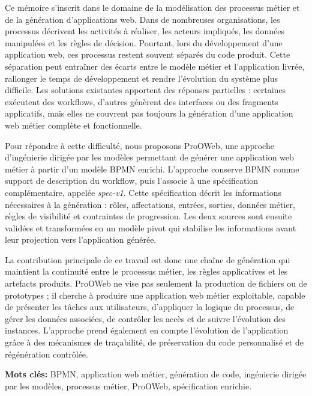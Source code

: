 \let\oldprintchaptertitle=\printchaptertitle
\renewcommand{\printchaptertitle}[1]{%
	\vspace*{-75pt}
	\oldprintchaptertitle{#1}
}%
\let\printchaptertitle=\oldprintchaptertitle

Ce mémoire s'inscrit dans le domaine de la modélisation des processus métier et de la génération d'applications web. Dans de nombreuses organisations, les processus décrivent les activités à réaliser, les acteurs impliqués, les données manipulées et les règles de décision. Pourtant, lors du développement d'une application web, ces processus restent souvent séparés du code produit. Cette séparation peut entraîner des écarts entre le modèle métier et l'application livrée, rallonger le temps de développement et rendre l'évolution du système plus difficile. Les solutions existantes apportent des réponses partielles : certaines exécutent des workflows, d'autres génèrent des interfaces ou des fragments applicatifs, mais elles ne couvrent pas toujours la génération d'une application web métier complète et fonctionnelle.

Pour répondre à cette difficulté, nous proposons ProOWeb, une approche d'ingénierie dirigée par les modèles permettant de générer une application web métier à partir d'un modèle BPMN enrichi. L'approche conserve BPMN comme support de description du workflow, puis l'associe à une spécification complémentaire, appelée \textit{spec-v1}. Cette spécification décrit les informations nécessaires à la génération : rôles, affectations, entrées, sorties, données métier, règles de visibilité et contraintes de progression. Les deux sources sont ensuite validées et transformées en un modèle pivot qui stabilise les informations avant leur projection vers l'application générée.

La contribution principale de ce travail est donc une chaîne de génération qui maintient la continuité entre le processus métier, les règles applicatives et les artefacts produits. ProOWeb ne vise pas seulement la production de fichiers ou de prototypes ; il cherche à produire une application web métier exploitable, capable de présenter les tâches aux utilisateurs, d'appliquer la logique du processus, de gérer les données associées, de contrôler les accès et de suivre l'évolution des instances. L'approche prend également en compte l'évolution de l'application grâce à des mécanismes de traçabilité, de préservation du code personnalisé et de régénération contrôlée.

\vspace{0.8cm}
\noindent\textbf{Mots clés:} BPMN, application web métier, génération de code, ingénierie dirigée par les modèles, processus métier, ProOWeb, spécification enrichie.

\myCleanStarChapterEnd
